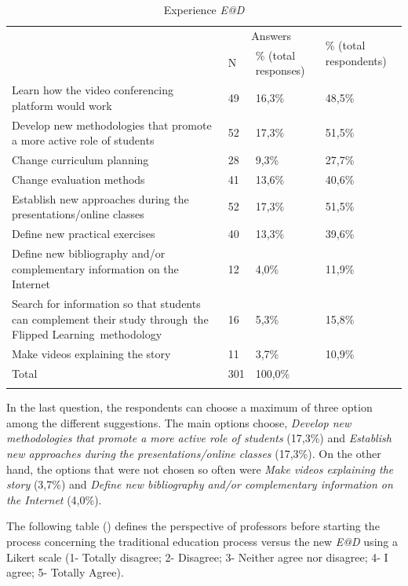 \documentclass{textolivre}
\begin{document}
\begin{table}[htpb]
\caption{Experience \emph{E@D}}
\label{tab3}
\small
\centering
\begin{tabular}{p{}p{}p{}p{}}
\toprule
& \multicolumn{2}{c}{Answers} & \multirow{2}{*}{\% (total respondents)}
\\
\cmidrule{2-3}
& N & \% (total responses) & 
\\
\midrule
\arrayrulecolor[gray]{.7}
Learn how the video conferencing platform would work & 49 & 16,3\% & 48,5\%
\\
Develop new methodologies that promote a more active role of students & 52 & 17,3\% & 51,5\%
\\
Change curriculum planning & 28 & 9,3\% & 27,7\%
\\
Change evaluation methods & 41 & 13,6\% & 40,6\%
\\
Establish new approaches during the presentations/online classes & 52 & 17,3\% & 51,5\%
\\
Define new practical exercises & 40 & 13,3\% & 39,6\%
\\
Define new bibliography and/or complementary information on the Internet & 12 & 4,0\% & 11,9\%
\\
Search for information so that students can complement their study through the Flipped Learning methodology & 16 & 5,3\% & 15,8\%
\\
Make videos explaining the story & 11 & 3,7\% & 10,9\%
\\
Total & 301 & 100,0\% & 
\\
\arrayrulecolor{black}
\bottomrule
\end{tabular}
\centering
{}
\end{table}

In the last question, the respondents can choose a maximum of three option among the different suggestions. The main options choose, \emph{Develop new methodologies that promote a more active role of students} (17,3\%) and \emph{Establish new approaches during the presentations/online classes} (17,3\%). On the other hand, the options that were not chosen so often were \emph{Make videos explaining the story} (3,7\%) and \emph{Define new bibliography and/or complementary information on the Internet} (4,0\%).

The following table () defines the perspective of professors before starting the process concerning the traditional education process versus the new \emph{E@D} using a Likert scale (1- Totally disagree; 2- Disagree; 3- Neither agree nor disagree; 4- I agree; 5- Totally Agree).
\end{document}
